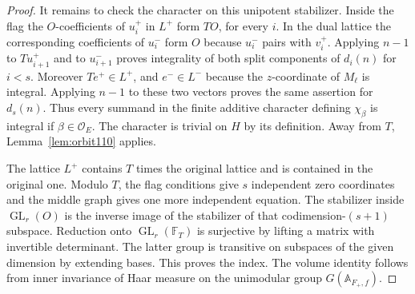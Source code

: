 \documentclass[a4paper,11pt]{article}
\theoremstyle{definition}
\theoremstyle{remark}
\numberwithin{equation}{section}
\newcommand{\GL}{\operatorname{GL}}
\newcommand{\OO}{\mathcal O}
\begin{document}
\begin{proof}
It remains to check the character on this unipotent stabilizer.
Inside the flag the \(O\)-coefficients of \(u_i^+\) in \(L^+\)
form \(TO\), for every \(i\). In the dual lattice the corresponding
coefficients of \(u_i^-\) form \(O\) because \(u_i^-\) pairs
with \(v_i^+\). Applying \(n-1\) to \(Tu_{i+1}^+\) and to
\(u_{i+1}^-\) proves integrality of both split components of
\(d_i(n)\) for \(i<s\). Moreover \(Te^+\in L^+\), and
\(e^-\in L^-\) because the \(z\)-coordinate of \(M_\ell\) is
integral. Applying \(n-1\) to these two vectors proves the
same assertion for \(d_s(n)\). Thus every summand in the
finite additive character defining \(\chi_\beta\) is integral
if \(\beta\in\OO_E\). The character is trivial on \(H\) by its
definition. Away from \(T\), Lemma~\ref{lem:orbit110} applies.

The lattice \(L^+\) contains \(T\) times the original lattice
and is contained in the original one. Modulo \(T\), the flag
conditions give \(s\) independent zero coordinates and the
middle graph gives one more independent equation. The stabilizer
inside \(\GL_r(O)\) is the inverse image of the stabilizer of
that codimension-\((s+1)\) subspace. Reduction onto \(\GL_r(\mathbb F_T)\)
is surjective by lifting a matrix with invertible determinant.
The latter group is transitive on subspaces of the given dimension
by extending bases. This proves the index. The volume identity
follows from inner invariance of Haar measure on the unimodular
group \(G(\mathbb A_{F_+,f})\).
\end{proof}
\end{document}
